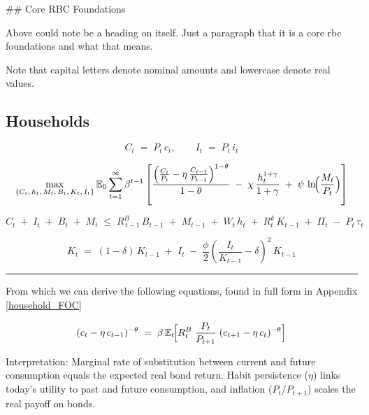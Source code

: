 \documentclass[11pt,preprint]{elsarticle}
\numberwithin{equation}{section}
\numberwithin{figure}{section}
\numberwithin{table}{section}
\begin{document}
\#\# Core RBC Foundations

Above could note be a heading on itself. Just a paragraph that it is a
core rbc foundations and what that means.

Note that capital letters denote nominal amounts and lowercase denote
real values.

\subsection{Households}\label{households}

\begin{equation}
C_t \;=\; P_t \, c_t,
\qquad
I_t \;=\; P_t \, i_t
\label{nominal_definitions}
\end{equation}

\begin{equation}
\max_{\{C_t,\,h_t,\,M_t,\,B_t,\,K_t,\,I_t\}}
\mathbb{E}_0 \sum_{t=1}^{\infty} \beta^{t-1}
\left[
\frac{\Bigl(\frac{C_t}{P_t} - \eta\,\frac{C_{t-1}}{P_{t-1}}\Bigr)^{1-\theta}}{1-\theta}
\;-\;\chi\,\frac{h_t^{1+\gamma}}{1+\gamma}
\;+\;\psi\,\ln\!\Bigl(\frac{M_t}{P_t}\Bigr)
\right]
\label{lifetime_utility_nominal}
\end{equation}

\begin{equation}
C_t \;+\; I_t \;+\; B_t \;+\; M_t
\;\le\;
R^B_{\,t-1}\,B_{t-1}
\;+\; M_{t-1}
\;+\; W_t\,h_t
\;+\; R^k_t\,K_{t-1}
\;+\; \Pi_t
\;-\; P_t\,\tau_t
\label{flow_constraint_nominal}
\end{equation}

\begin{equation}
K_t
\;=\;
(1 - \delta)\,K_{t-1}
\;+\; I_t
\;-\;\frac{\phi}{2}
\left(\frac{I_t}{K_{t-1}} - \delta\right)^{2}
\,K_{t-1}
\label{capital_accumulation_nominal}
\end{equation}

\begin{center}\rule{0.5\linewidth}{0.5pt}\end{center}

From which we can derive the following equations, found in full form in
Appendix \ref{household_FOC}

\begin{equation}\label{consEuler}
  (c_t - \eta\,c_{t-1})^{-\theta}
  \;=\;
  \beta\,\mathbb{E}_t\!\Bigl[
    R_t^B \;\frac{P_t}{P_{t+1}}\;(c_{t+1} - \eta\,c_t)^{-\theta}
  \Bigr]
\end{equation}

Interpretation: Marginal rate of substitution between current and future
consumption equals the expected real bond return. Habit persistence
(\(\eta\)) links today's utility to past and future consumption, and
inflation (\(P_t/P_{t+1}\)) scales the real payoff on bonds.
\end{document}
